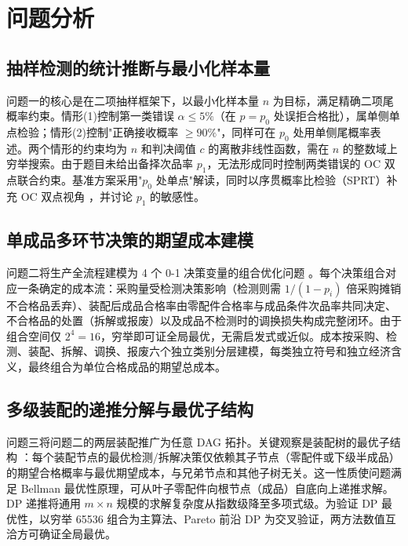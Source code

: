 \documentclass[12pt,a4paper]{ctexart}
\begin{document}
\section{问题分析}

\subsection{抽样检测的统计推断与最小化样本量}

问题一的核心是在二项抽样框架下\cite{ref12}，以最小化样本量 $n$ 为目标，满足精确二项尾概率约束。情形(1)控制第一类错误 $\alpha\le 5\%$（在 $p=p_0$ 处误拒合格批），属单侧单点检验；情形(2)控制"正确接收概率 $\ge 90\%$"，同样可在 $p_0$ 处用单侧尾概率表述。两个情形的约束均为 $n$ 和判决阈值 $c$ 的离散非线性函数，需在 $n$ 的整数域上穷举搜索。由于题目未给出备择次品率 $p_1$，无法形成同时控制两类错误的 OC 双点联合约束。基准方案采用"$p_0$ 处单点"解读，同时以序贯概率比检验（SPRT）补充 OC 双点视角 \cite{ref1}，并讨论 $p_1$ 的敏感性。

\subsection{单成品多环节决策的期望成本建模}

问题二将生产全流程建模为 4 个 0-1 决策变量的组合优化问题 \cite{ref9}。每个决策组合对应一条确定的成本流：采购量受检测决策影响（检测则需 $1/(1-p_i)$ 倍采购摊销不合格品丢弃）、装配后成品合格率由零配件合格率与成品条件次品率共同决定、不合格品的处置（拆解或报废）以及成品不检测时的调换损失构成完整闭环。由于组合空间仅 $2^4=16$，穷举即可证全局最优，无需启发式或近似。成本按采购、检测、装配、拆解、调换、报废六个独立类别分层建模，每类独立符号和独立经济含义，最终组合为单位合格成品的期望总成本。

\subsection{多级装配的递推分解与最优子结构}

问题三将问题二的两层装配推广为任意 DAG 拓扑。关键观察是装配树的最优子结构 \cite{ref4}：每个装配节点的最优检测/拆解决策仅依赖其子节点（零配件或下级半成品）的期望合格概率与最优期望成本，与兄弟节点和其他子树无关。这一性质使问题满足 Bellman 最优性原理，可从叶子零配件向根节点（成品）自底向上递推求解。DP 递推将通用 $m\times n$ 规模的求解复杂度从指数级降至多项式级。为验证 DP 最优性，以穷举 65536 组合为主算法、Pareto 前沿 DP 为交叉验证，两方法数值互洽方可确证全局最优。
\end{document}
